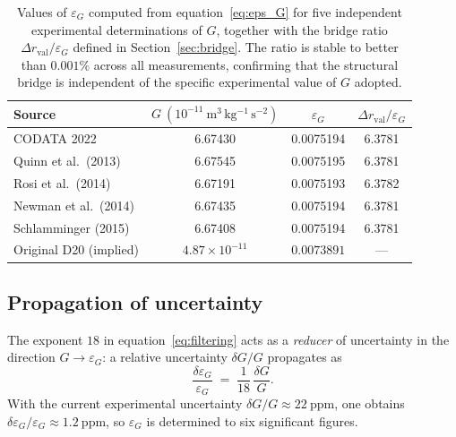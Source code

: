 \documentclass[11pt,a4paper]{article}
\begin{document}
\begin{table}[ht]
\centering
\caption{Values of $\varepsilon_G$ computed from equation~\eqref{eq:eps_G} for five independent experimental determinations of $G$, together with the bridge ratio $\Delta r_{\mathrm{val}}/\varepsilon_G$ defined in Section~\ref{sec:bridge}. The ratio is stable to better than $0.001\%$ across all measurements, confirming that the structural bridge is independent of the specific experimental value of $G$ adopted.}

\bigskip

\label{tab:G_survey}
\begin{tabular}{lccc}
\toprule
Source 
    & $G\ (10^{-11}\ \mathrm{m^3\,kg^{-1}\,s^{-2}})$ 
    & $\varepsilon_G$ 
    & $\Delta r_{\mathrm{val}}/\varepsilon_G$ \\
\midrule
CODATA 2022           & 6.67430 & 0.0075194 & 6.3781 \\
Quinn et al.\ (2013)  & 6.67545 & 0.0075195 & 6.3781 \\
Rosi et al.\ (2014)   & 6.67191 & 0.0075193 & 6.3782 \\
Newman et al.\ (2014) & 6.67435 & 0.0075194 & 6.3781 \\
Schlamminger (2015)   & 6.67408 & 0.0075194 & 6.3781 \\
\midrule
Original D20 (implied) 
    & $4.87\times10^{-11}$ 
    & $0.0073891$ 
    & --- \\
\bottomrule
\end{tabular}
\end{table}

\subsection{Propagation of uncertainty}
\label{sec:uncertainty}

The exponent $18$ in equation~\eqref{eq:filtering} acts as a \emph{reducer} of uncertainty in the direction $G \to \varepsilon_G$: a relative uncertainty $\delta G/G$ propagates as
\begin{equation}
    \frac{\delta\varepsilon_G}{\varepsilon_G} 
    \;=\; \frac{1}{18}\,\frac{\delta G}{G}.
    \label{eq:uncertainty_down}
\end{equation}
With the current experimental uncertainty $\delta G/G \approx 22\ \mathrm{ppm}$, one obtains $\delta\varepsilon_G/\varepsilon_G \approx 1.2\ \mathrm{ppm}$, so $\varepsilon_G$ is determined to six significant figures.
\end{document}
